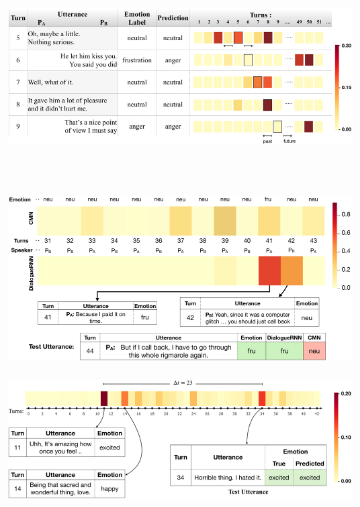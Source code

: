 \documentclass[letterpaper]{article} %
\begin{document}
\begin{figure}[!htbp]
  \centering
  \begin{subfigure}{0.49\textwidth}
  \centering
	\includegraphics[width=\linewidth]{future_attention}
  \caption{}
  \label{fig:case-study}
  \end{subfigure}%
  ~
\begin{subfigure}{0.49\textwidth}
	\centering
  \small
	\includegraphics[width=\linewidth]{alpha_attention} 
	\caption{}
	\label{fig:AlphaAttention}
\end{subfigure}
\begin{subfigure}{0.49\textwidth}
	\centering
  \small
	\includegraphics[width=\linewidth]{distant_attention} 
	\caption{}
	\label{fig:DistantAttention}
\end{subfigure}%
  ~
\begin{subfigure}{0.49\textwidth}

\end{subfigure}
\end{figure}
\end{document}
